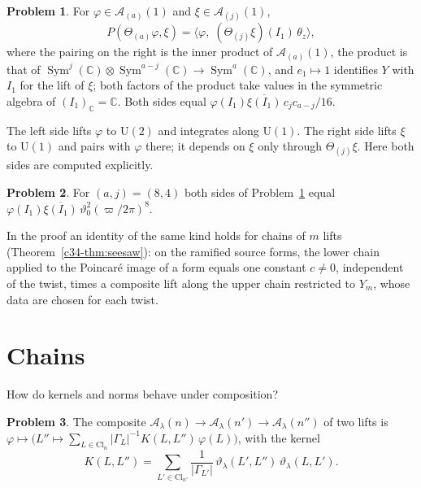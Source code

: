 \documentclass[reqno]{amsart}
\theoremstyle{definition}
\newtheorem{problem}{Problem}[section]
\theoremstyle{plain}
\newcommand{\C}{\mathbb{C}}
\newcommand{\Ac}{\mathcal{A}}
\newcommand{\Cl}{\mathrm{Cl}}
\newcommand{\Sym}{\operatorname{Sym}}
\begin{document}
\begin{problem}\label{pr:seesaw}
For \(\varphi \in \Ac_{(a)}(1)\) and \(\xi \in \Ac_{(j)}(1)\),
\[
  P(\Theta_{(a)}\varphi, \xi) = \bigl\langle \varphi,\; (\Theta_{(j)}\xi)(I_1)\, \theta_z \bigr\rangle ,
\]
where the pairing on the right is the inner product of \(\Ac_{(a)}(1)\), the product is that of \(\Sym^j(\C) \otimes \Sym^{a-j}(\C) \to \Sym^a(\C)\), and \(e_1 \mapsto 1\) identifies \(Y\) with \(I_1\) for the lift of \(\xi\); both factors of the product take values in the symmetric algebra of \((I_1)_\C = \C\).  Both sides equal \(\varphi(I_1)\overline{\xi(I_1)}\, c_j c_{a-j}/16\).
\end{problem}

The left side lifts \(\varphi\) to \(\mathrm{U}(2)\) and integrates along \(\mathrm{U}(1)\).  The right side lifts \(\xi\) to \(\mathrm{U}(1)\) and pairs with \(\varphi\) there; it depends on \(\xi\) only through \(\Theta_{(j)}\xi\).  Here both sides are computed explicitly.

\begin{problem}\label{pr:seesaw-eight}
For \((a, j) = (8, 4)\) both sides of Problem~\ref{pr:seesaw} equal \(\varphi(I_1)\overline{\xi(I_1)}\, \vartheta_0^2 (\varpi/2\pi)^8\).
\end{problem}

In the proof an identity of the same kind holds for chains of \(m\) lifts (Theorem~\ref{c34-thm:seesaw}): on the ramified source forms, the lower chain applied to the Poincar\'e image of a form equals one constant \(c \ne 0\), independent of the twist, times a composite lift along the upper chain restricted to \(Y_m\), whose data are chosen for each twist.

\section{Chains}\label{sec:chain}

How do kernels and norms behave under composition?

\begin{problem}\label{pr:compose}
The composite \(\Ac_\lambda(n) \to \Ac_\lambda(n') \to \Ac_\lambda(n'')\) of two lifts is \(\varphi \mapsto \bigl(L'' \mapsto \sum_{L \in \Cl_n} \lvert\Gamma_L\rvert^{-1} K(L, L'')\,\varphi(L)\bigr)\), with the kernel
\[
  K(L, L'') = \sum_{L' \in \Cl_{n'}} \frac{1}{\lvert\Gamma_{L'}\rvert}\, \vartheta_\lambda(L', L'')\, \vartheta_\lambda(L, L') .
\]
\end{problem}
\end{document}
